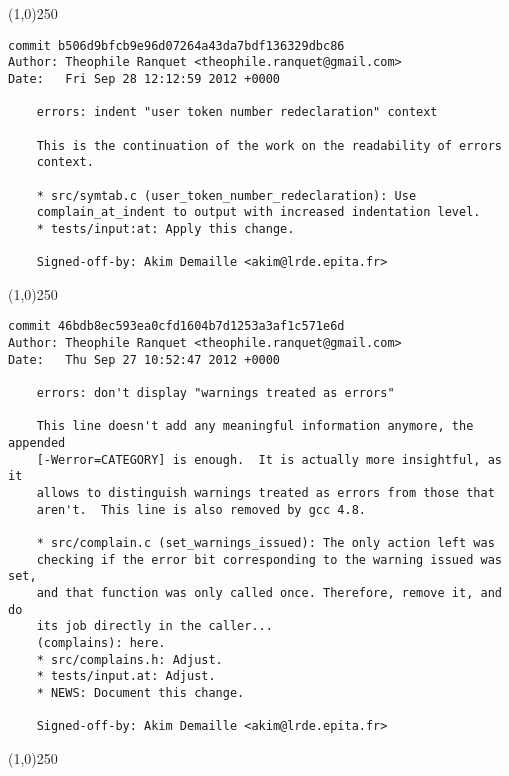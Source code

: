 \line(1,0){250}
\begin{verbatim}
commit b506d9bfcb9e96d07264a43da7bdf136329dbc86
Author: Theophile Ranquet <theophile.ranquet@gmail.com>
Date:   Fri Sep 28 12:12:59 2012 +0000

    errors: indent "user token number redeclaration" context
    
    This is the continuation of the work on the readability of errors
    context.
    
    * src/symtab.c (user_token_number_redeclaration): Use
    complain_at_indent to output with increased indentation level.
    * tests/input:at: Apply this change.
    
    Signed-off-by: Akim Demaille <akim@lrde.epita.fr>

\end{verbatim}
\line(1,0){250}
\begin{verbatim}
commit 46bdb8ec593ea0cfd1604b7d1253a3af1c571e6d
Author: Theophile Ranquet <theophile.ranquet@gmail.com>
Date:   Thu Sep 27 10:52:47 2012 +0000

    errors: don't display "warnings treated as errors"
    
    This line doesn't add any meaningful information anymore, the appended
    [-Werror=CATEGORY] is enough.  It is actually more insightful, as it
    allows to distinguish warnings treated as errors from those that
    aren't.  This line is also removed by gcc 4.8.
    
    * src/complain.c (set_warnings_issued): The only action left was
    checking if the error bit corresponding to the warning issued was set,
    and that function was only called once. Therefore, remove it, and do
    its job directly in the caller...
    (complains): here.
    * src/complains.h: Adjust.
    * tests/input.at: Adjust.
    * NEWS: Document this change.
    
    Signed-off-by: Akim Demaille <akim@lrde.epita.fr>

\end{verbatim}
\line(1,0){250}

